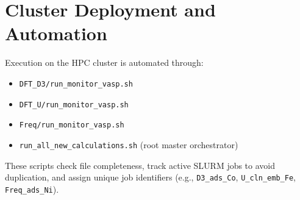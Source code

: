 \documentclass[11pt]{article}
\begin{document}
\section{Cluster Deployment and Automation}
Execution on the HPC cluster is automated through:
\begin{itemize}
    \item \texttt{DFT\_D3/run\_monitor\_vasp.sh}
    \item \texttt{DFT\_U/run\_monitor\_vasp.sh}
    \item \texttt{Freq/run\_monitor\_vasp.sh}
    \item \texttt{run\_all\_new\_calculations.sh} (root master orchestrator)
\end{itemize}
These scripts check file completeness, track active SLURM jobs to avoid duplication, and assign unique job identifiers (e.g., \texttt{D3\_ads\_Co}, \texttt{U\_cln\_emb\_Fe}, \texttt{Freq\_ads\_Ni}).
\end{document}
